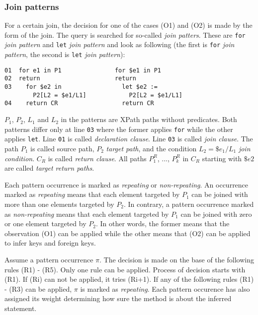 \subsubsection{Join patterns}
For a certain join, the decision for one of the cases (O1) and (O2) is made by the form of the join. The query is searched for so-called \emph{join patters}. These are \texttt{for} \emph{join pattern} and \texttt{let} \emph{join pattern} and look as following (the first is \texttt{for} \emph{join pattern}, the second is \texttt{let} \emph{join pattern}):
\begin{verbatim}
01  for e1 in P1               for $e1 in P1
02  return                     return
03    for $e2 in                 let $e2 :=
        P2[L2 = $e1/L1]            P2[L2 = $e1/L1]
04    return CR                  return CR
\end{verbatim}

$P_1$, $P_2$, $L_1$ and $L_2$ in the patterns are XPath paths without predicates. Both patterns differ only at line \texttt{03} where the former applies \texttt{for} while the other applies \texttt{let}. Line \texttt{01} is called \emph{declaration clause}. Line \texttt{03} is called \emph{join clause}. The path $P_1$ is called source path, $P_2$ \emph{target path}, and the condition $L_2 = \$e_1/L_1$ \emph{join condition}. $C_R$ is called \emph{return clause}. All paths $P_1^R$, ..., $P_k^R$ in $C_R$
starting with $\$e2$ are called \emph{target return paths}.

Each pattern occurrence is marked as \emph{repeating} or \emph{non-repeating}. An occurrence marked as \emph{repeating} means that each element targeted by $P_1$ can be joined with more than one elements targeted by $P_2$. In contrary, a pattern occurrence marked as \emph{non-repeating} means that each element targeted by $P_1$ can be joined with zero or one element targeted by $P_2$. In other words, the former means that the observation (O1) can be applied while the other means that (O2) can be applied to infer keys and foreign keys.

Assume a pattern occurrence $\pi$. The decision is made on the base of the following rules (R1) - (R5). Only one rule can be applied. Process of decision starts with (R1). If (Ri) can not be applied, it tries (Ri+1). If any of the following rules (R1) - (R3) can be applied, $\pi$ is marked as \emph{repeating}. Each pattern occurence has also assigned its weight determining how sure the method is about the inferred statement.

